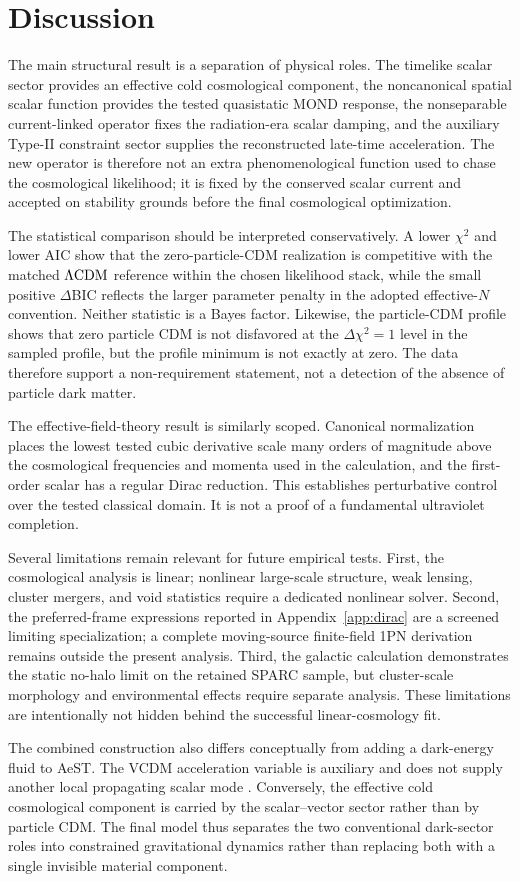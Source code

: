 \section{Discussion}\label{sec:discussion}
The main structural result is a separation of physical roles. The timelike scalar sector provides an effective cold cosmological component, the noncanonical spatial scalar function provides the tested quasistatic MOND response, the nonseparable current-linked operator fixes the radiation-era scalar damping, and the auxiliary Type-II constraint sector supplies the reconstructed late-time acceleration. The new operator is therefore not an extra phenomenological function used to chase the cosmological likelihood; it is fixed by the conserved scalar current and accepted on stability grounds before the final cosmological optimization.

The statistical comparison should be interpreted conservatively. A lower $\chi^2$ and lower AIC show that the zero-particle-CDM realization is competitive with the matched $\Lambda\mathrm{CDM}$ reference within the chosen likelihood stack, while the small positive $\Delta$BIC reflects the larger parameter penalty in the adopted effective-$N$ convention. Neither statistic is a Bayes factor. Likewise, the particle-CDM profile shows that zero particle CDM is not disfavored at the $\Delta\chi^2=1$ level in the sampled profile, but the profile minimum is not exactly at zero. The data therefore support a non-requirement statement, not a detection of the absence of particle dark matter.

The effective-field-theory result is similarly scoped. Canonical normalization places the lowest tested cubic derivative scale many orders of magnitude above the cosmological frequencies and momenta used in the calculation, and the first-order scalar has a regular Dirac reduction. This establishes perturbative control over the tested classical domain. It is not a proof of a fundamental ultraviolet completion.

Several limitations remain relevant for future empirical tests. First, the cosmological analysis is linear; nonlinear large-scale structure, weak lensing, cluster mergers, and void statistics require a dedicated nonlinear solver. Second, the preferred-frame expressions reported in Appendix~\ref{app:dirac} are a screened limiting specialization; a complete moving-source finite-field 1PN derivation remains outside the present analysis. Third, the galactic calculation demonstrates the static no-halo limit on the retained SPARC sample, but cluster-scale morphology and environmental effects require separate analysis. These limitations are intentionally not hidden behind the successful linear-cosmology fit.

The combined construction also differs conceptually from adding a dark-energy fluid to AeST. The VCDM acceleration variable is auxiliary and does not supply another local propagating scalar mode \cite{DeFeliceMaedaMukohyamaPookkillath2022}. Conversely, the effective cold cosmological component is carried by the scalar--vector sector rather than by particle CDM. The final model thus separates the two conventional dark-sector roles into constrained gravitational dynamics rather than replacing both with a single invisible material component.
